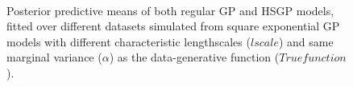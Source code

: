 \documentclass[]{interact}
\theoremstyle{plain}%
\theoremstyle{definition}
\theoremstyle{remark}
\begin{document}
\begin{figure}
\\
\vspace{-3mm}
\caption{Posterior predictive means of both regular GP and HSGP models, fitted over different datasets simulated from square exponential GP models with different characteristic lengthscales ($lscale$) and same marginal variance ($\alpha$) as the data-generative function ($True function$).}
  \label{fig7_posterior_varing_lscale_part1}
\end{figure}
\end{document}
